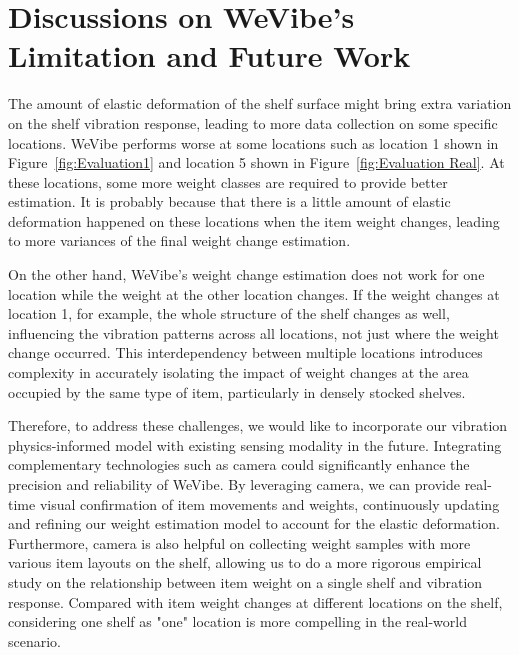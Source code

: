 \section{Discussions on WeVibe's Limitation and Future Work}
\label{sec:Limitations of WeVibe}
The amount of elastic deformation of the shelf surface might bring extra variation on the shelf vibration response, leading to more data collection on some specific locations. WeVibe performs worse at some locations such as location 1 shown in Figure~\ref{fig:Evaluation1} and location 5 shown in Figure~\ref{fig:Evaluation Real}. At these locations, some more weight classes are required to provide better estimation. It is probably because that there is a little amount of elastic deformation happened on these locations when the item weight changes, leading to more variances of the final weight change estimation.

On the other hand, WeVibe's weight change estimation does not work for one location while the weight at the other location changes. If the weight changes at location 1, for example, the whole structure of the shelf changes as well, influencing the vibration patterns across all locations, not just where the weight change occurred. This interdependency between multiple locations introduces complexity in accurately isolating the impact of weight changes at the area occupied by the same type of item, particularly in densely stocked shelves.

Therefore, to address these challenges, we would like to incorporate our vibration physics-informed model with existing sensing modality in the future. Integrating complementary technologies such as camera could significantly enhance the precision and reliability of WeVibe. By leveraging camera, we can provide real-time visual confirmation of item movements and weights, continuously updating and refining our weight estimation model to account for the elastic deformation. Furthermore, camera is also helpful on collecting weight samples with more various item layouts on the shelf, allowing us to do a more rigorous empirical study on the relationship between item weight on a single shelf and vibration response. Compared with item weight changes at different locations on the shelf, considering one shelf as "one" location is more compelling in the real-world scenario.
